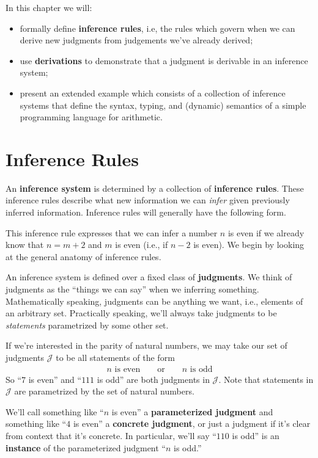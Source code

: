 \bigskip

\noindent In this chapter we will:
\begin{itemize}
\item formally define \textbf{inference rules}, i.e, the rules which govern when we can derive new judgments from judgements we've already derived;
\item use \textbf{derivations} to demonstrate that a judgment is derivable in an inference system;
\item present an extended example which consists of a collection of inference systems that define the syntax, typing, and (dynamic) semantics of a simple programming language for arithmetic.
\end{itemize}

\section{Inference Rules}

An \textbf{inference system} is determined by a collection of \textbf{inference rules}.
These inference rules describe what new information we can \textit{infer} given previously inferred information.
Inference rules will generally have the following form.
\begin{mathpar}
\end{mathpar}
This inference rule expresses that we can infer a number $n$ is even if we already know that $n = m + 2$ and $m$ is even (i.e., if $n - 2$ is even).
We begin by looking at the general anatomy of inference rules.

An inference system is defined over a fixed class of \textbf{judgments}.
We think of judgments as the \enquote{things we can say} when we inferring something.
Mathematically speaking, judgments can be anything we want, i.e., elements of an arbitrary set.
Practically speaking, we'll always take judgments to be \textit{statements} parametrized by some other set.
\begin{example}
  \label{ex:evens-odds}
  If we're interested in the parity of natural numbers, we may take our set of judgments $\mathcal J$ to be all statements of the form
  \begin{align*}
    \text{$n$ is even} \qquad \text{or} \qquad \text{$n$ is odd}
  \end{align*}
  So \enquote{$7$ is even} and \enquote{$111$ is odd} are both judgments in $\mathcal J$.
  Note that statements in $\mathcal J$ are parametrized by the set of natural numbers.
\end{example}
We'll call something like \enquote{$n$ is even} a \textbf{parameterized judgment} and something like \enquote{$4$ is even} a \textbf{concrete judgment}, or just a judgment if it's clear from context that it's concrete.
In particular, we'll say \enquote{$110$ is odd} is an \textbf{instance} of the parameterized judgment \enquote{$n$ is odd.}

